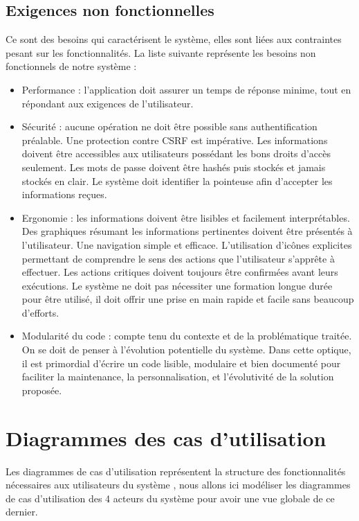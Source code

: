 \subsection{Exigences non fonctionnelles}
Ce sont des besoins qui caractérisent le système, elles sont liées aux
contraintes pesant sur les fonctionnalités. La liste suivante représente les
besoins non fonctionnels de notre système :

\begin{itemize}
    \item [\textbullet] Performance : l’application doit assurer un temps de
        réponse minime, tout en répondant aux exigences de l’utilisateur.
    
    \item [\textbullet] Sécurité : aucune opération ne doit être possible sans
        authentification préalable. Une protection contre CSRF est impérative.
        Les informations doivent être accessibles aux utilisateurs possédant les
        bons droits d’accès seulement. Les mots de passe doivent être hashés
        puis stockés et jamais stockés en clair. Le système doit identifier la
        pointeuse afin d’accepter les informations reçues.
    
    \item [\textbullet] Ergonomie : les informations doivent être lisibles et
        facilement interprétables. Des graphiques résumant les informations
        pertinentes doivent être présentés à l’utilisateur. Une navigation
        simple et efficace. L’utilisation d’icônes explicites permettant de
        comprendre le sens des actions que l’utilisateur s’apprête à effectuer.
        Les actions critiques doivent toujours être confirmées avant leurs
        exécutions. Le système ne doit pas nécessiter une formation longue durée
        pour être utilisé, il doit offrir une prise en main rapide et facile
        sans beaucoup d’efforts.
    
     \item [\textbullet] Modularité du code : compte tenu du contexte et de la
         problématique traitée. On se doit de penser à l’évolution potentielle
         du système. Dans cette optique, il est primordial d’écrire un code
         lisible, modulaire et bien documenté pour faciliter la maintenance, la
         personnalisation, et l’évolutivité de la solution proposée.
\end{itemize}
                

\section{Diagrammes des cas d'utilisation}
Les diagrammes de cas d’utilisation représentent la structure des
fonctionnalités nécessaires aux utilisateurs du système \cite{6}, nous allons
ici modéliser les diagrammes de cas d’utilisation des 4 acteurs du système pour
avoir une vue globale de ce dernier.


